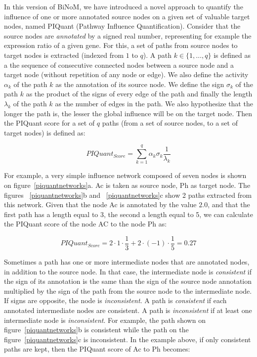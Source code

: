 \documentclass[10pt]{bmc_article}
\newenvironment{bmcformat}{\baselineskip20pt\sloppy\setboolean{publ}{false}}{\baselineskip20pt\sloppy}
\begin{document}
\begin{bmcformat}
In this version of BiNoM, we have introduced a novel approach to quantify the
influence of one or more annotated source nodes on a given set of valuable target nodes, 
named PIQuant (Pathway Influence Quantification). Consider that the source nodes are 
 \textit{annotated} by a signed real number, representing for example the expression ratio 
of a given gene.
For this, a set of paths from source nodes to target nodes is extracted (indexed from $1$ to $q$). 
 A path $k \in \{1,\ldots , q\}$ is defined
as a the sequence of consecutive connected nodes
between a source node and a target node (without repetition of any node
or edge). We also define the activity $\alpha_k$ of the path $k$ as the annotation
of its source node. We define the sign $\sigma_k$
of the path $k$ as the product of the signs of every edge of the path and finally
the length $\lambda_k$ of the path $k$ as the number of edges in the path. We also
hypothesize that the longer the path is, the lesser the global influence will be
on the target node. Then the PIQuant score for a set of $q$ paths (from a set of 
source nodes, to a set of target nodes) is defined as:

$$
 PIQuant_{Score} = \sum_{k=1}^{q} \alpha_{k} \sigma_{k} \frac{1}{\lambda_{k}}
$$

For example, a very simple influence network composed of seven nodes is shown on
figure~\ref{piquantnetworks}a. Ac is taken as source node, Ph as target node. 
The figures ~\ref{piquantnetworks}b and
~\ref{piquantnetworks}c show 2 paths extracted from this network. Given that the
node Ac is annotated by the value $2.0$, and that the first path has a length
equal to 3, the second a length equal to 5, we can calculate the PIQuant score 
of the node AC to the node Ph as:

$$
 PIQuant_{Score} = 2 \cdot 1 \cdot \frac{1}{3} + 2 \cdot (-1) \cdot \frac{1}{5}
= 0.27
$$


Sometimes a path has one or more intermediate nodes that are annotated nodes, 
in addition to the source node.
In that case, the intermediate node is \textit{consistent} if the sign of its 
annotation is
the same than the sign of the source node annotation multiplied by the sign of the 
path from the source node
to the intermediate node. If signs are opposite, the node is \textit{inconsistent}. 
A path is \textit{consistent} if each annotated intermediate nodes are consistent. 
A path is \textit{inconsistent} if at least one intermediate node is \textit{inconsistent}.
For example, the path shown on figure~\ref{piquantnetworks}b is consistent while
the path on the figure~\ref{piquantnetworks}c is inconsistent. In the example
above, if only consistent paths 
are kept, then the PIQuant score of Ac to Ph becomes:


\end{bmcformat}
\end{document}
